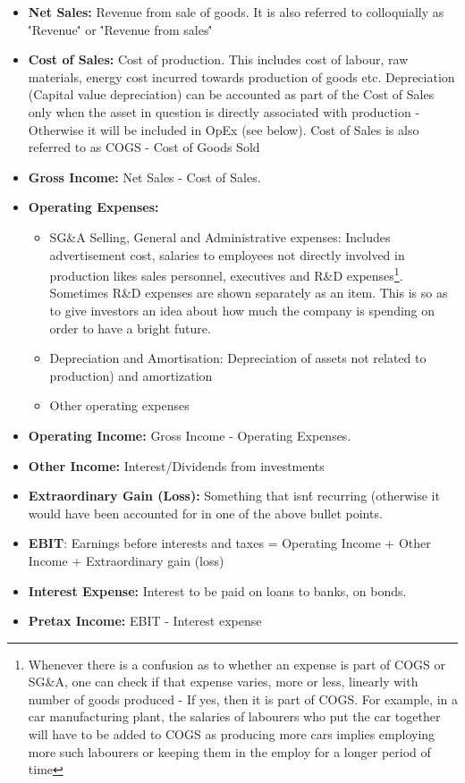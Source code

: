 \begin{itemize}
	\item \textbf{Net Sales:} Revenue from sale of goods. It is also referred to colloquially as \''Revenue\'' or \''Revenue from sales\''
	\item \textbf{Cost of Sales:} Cost of production. This includes cost of labour, raw materials, energy cost incurred towards production of goods etc. Depreciation (Capital value depreciation) can be accounted as part of the Cost of Sales only when the asset in question is directly associated with production - Otherwise it will be included in OpEx (see below). Cost of Sales is also referred to as COGS - Cost of Goods Sold
	\item \textbf{Gross Income:} Net Sales - Cost of Sales. 
	\item \textbf{Operating Expenses:} 
	\begin{itemize}
		\item SG\&A Selling, General and Administrative expenses: Includes advertisement cost, salaries to employees not directly involved in production likes sales personnel, executives and R\&D expenses\footnote{Whenever there is a confusion as to whether an expense is part of COGS or SG\&A, one can check if that expense varies, more or less, linearly with number of goods produced - If yes, then it is part of COGS. For example, in a car manufacturing plant, the salaries of labourers who put the car together will have to be added to COGS as producing more cars implies employing more such labourers or keeping them in the employ for a longer period of time}. Sometimes R\&D expenses are shown separately as an item. This is so as to give investors an idea about how much the company is spending on order to have a bright future. 
		\item Depreciation and Amortisation: Depreciation of assets not related to production) and amortization
		\item Other operating expenses
	\end{itemize} 
	\item \textbf{Operating Income:} Gross Income - Operating Expenses. 
	\item \textbf{Other Income:} Interest/Dividends from investments
	\item \textbf{Extraordinary Gain (Loss):} Something that isn\'t recurring (otherwise it would have been accounted for in one of the above bullet points.
	\item \textbf{EBIT}: Earnings before interests and taxes = Operating Income + Other Income + Extraordinary gain (loss)
	\item \textbf{Interest Expense:} Interest to be paid on loans to banks, on bonds.
	\item \textbf{Pretax Income:} EBIT - Interest expense
\end{itemize}

